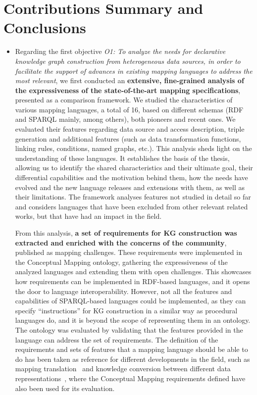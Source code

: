 \section{Contributions Summary and Conclusions}
\label{sec:chp7_summary}
\begin{itemize}
    \item Regarding the first objective \textit{O1: To analyze the needs for declarative knowledge graph construction from heterogeneous data sources, in order to facilitate the support of advances in existing mapping languages to address the most relevant}, we first conducted an \textbf{extensive, fine-grained analysis of the expressiveness of the state-of-the-art mapping specifications}, presented as a comparison framework. 
    We studied the characteristics of various mapping languages, a total of 16, based on different schemas (RDF and SPARQL mainly, among others), both pioneers and recent ones. 
    We evaluated their features regarding data source and access description, triple generation and additional features (such as data transformation functions, linking rules, conditions, named graphs, etc.). 
    This analysis sheds light on the understanding of these languages. 
    It establishes the basis of the thesis, allowing us to identify the shared characteristics and their ultimate goal, their differential capabilities and the motivation behind them, how the needs have evolved and the new language releases and extensions with them, as well as their limitations.
    The framework analyses features not studied in detail so far and considers languages that have been excluded from other relevant related works, but that have had an impact in the field. 
    
    From this analysis, \textbf{a set of requirements for KG construction was extracted and enriched with the concerns of the community}, published as mapping challenges. 
    These requirements were implemented in the Conceptual Mapping ontology, gathering the expressiveness of the analyzed languages and extending them with open challenges. This showcases how requirements can be implemented in RDF-based languages, and it opens the door to language interoperability. 
    However, not all the features and capabilities of SPARQL-based languages could be implemented, as they can specify ``instructions'' for KG construction in a similar way as procedural languages do, and it is beyond the scope of representing them in an ontology. 
    The ontology was evaluated by validating that the features provided in the language can address the set of requirements. 
    The definition of the requirements and sets of features that a mapping language should be able to do has been taken as reference for different developments in the field, such as mapping translation~\parencite{alhazmi2023forbackbench} and knowledge conversion between different data representations~\parencite{scrocca2024knowconv}, where the Conceptual Mapping requirements defined have also been used for its evaluation.
    

\end{itemize}
